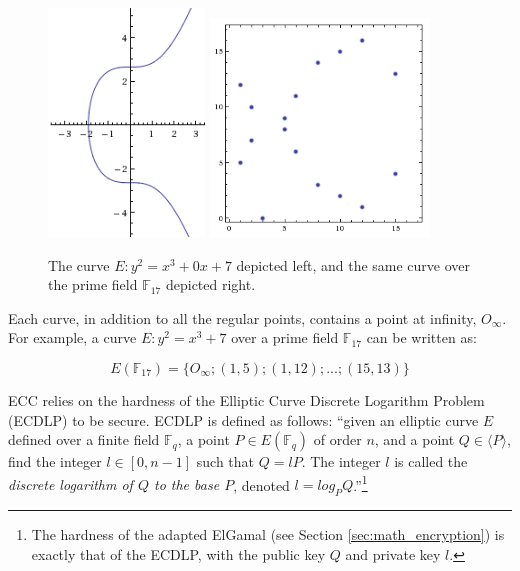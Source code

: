 \begin{figure}[htb]
	\centering
	\includegraphics[width=0.37\textwidth]{introduction/secp256k1-graph}
	\includegraphics[width=0.52\textwidth]{introduction/secp256k1-graph-over-field-p17}
	\caption{The curve \(E: y^2 = x^3 + 0x + 7\) depicted left, and the same curve over the prime field
		\(\mathbb{F}_{17}\) depicted right.}
	\label{fig:graphs}
\end{figure}

Each curve, in addition to all the regular points, contains a point at infinity, \(O_\infty\). For example, a
curve \(E: y^2 = x^3 + 7\) over a prime field \(\mathbb{F}_{17}\) can be written as:

\begin{equation}
	E(\mathbb{F}_{17}) = \{ O_\infty; (1,5); (1,12); ...; (15,13) \}
\end{equation}

ECC relies on the hardness of the Elliptic Curve Discrete Logarithm Problem (ECDLP) to be secure. ECDLP is
defined as follows: ``given an elliptic curve \(E\) defined over a finite field \(\mathbb{F}_q\), a point
\(P \in E(\mathbb{F}_q)\) of order \(n\), and a point \(Q \in \langle P \rangle\), find the integer
\(l \in [0,n-1]\) such that \(Q = lP\). The integer \(l\) is called the \emph{discrete logarithm of
\(Q\) to the base \(P\)}, denoted \(l = log_P Q\).''\footnote{The hardness of the adapted ElGamal (see
Section \ref{sec:math_encryption}) is exactly that of the ECDLP, with the public key \(Q\) and private
key \(l\).}\cite{hankerson2010}

